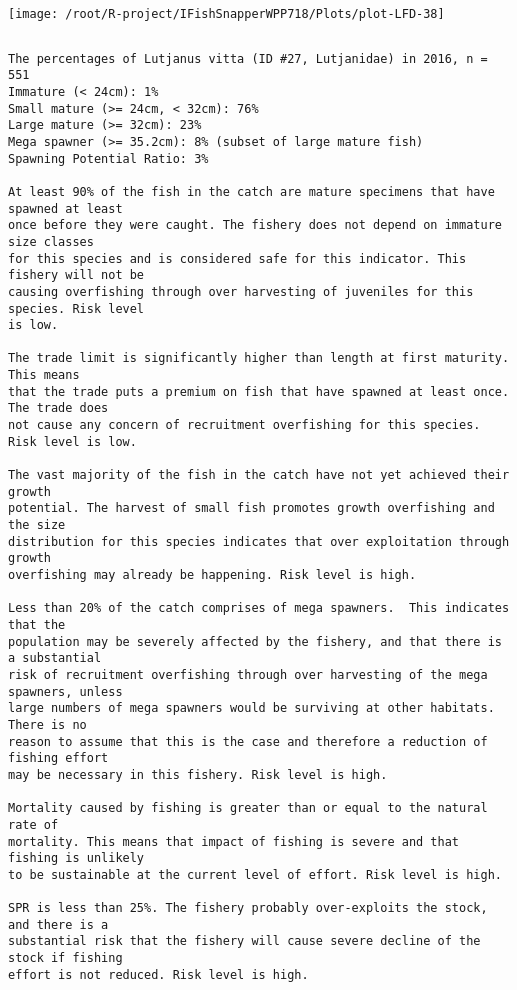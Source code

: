 \documentclass{report}\usepackage[]{graphicx}\usepackage[]{color}
\makeatletter
\def\maxwidth{ %
  \ifdim\Gin@nat@width>\linewidth
    \linewidth
  \else
    \Gin@nat@width
  \fi
}
\newenvironment{kframe}{%
 \def\at@end@of@kframe{}%
 \ifinner\ifhmode%
  \def\at@end@of@kframe{\end{minipage}}%
  \begin{minipage}{\columnwidth}%
 \fi\fi%
 \def\FrameCommand##1{\hskip\@totalleftmargin \hskip-\fboxsep
 \colorbox{shadecolor}{##1}\hskip-\fboxsep
     \hskip-\linewidth \hskip-\@totalleftmargin \hskip\columnwidth}%
 \MakeFramed {\advance\hsize-\width
   \@totalleftmargin\z@ \linewidth\hsize
   \@setminipage}}%
 {\par\unskip\endMakeFramed%
 \at@end@of@kframe}
\newenvironment{knitrout}{}{} %
\makeatother
\begin{document}
\begin{knitrout}
\texttt{[image: /root/R-project/IFishSnapperWPP718/Plots/plot-LFD-38]} 
\begin{kframe}\begin{verbatim}
\end{verbatim}
\end{kframe}
\clearpage
\newpage
\begin{kframe}\begin{verbatim}The percentages of Lutjanus vitta (ID #27, Lutjanidae) in 2016, n = 551
Immature (< 24cm): 1%
Small mature (>= 24cm, < 32cm): 76%
Large mature (>= 32cm): 23%
Mega spawner (>= 35.2cm): 8% (subset of large mature fish)
Spawning Potential Ratio: 3%
 
At least 90% of the fish in the catch are mature specimens that have spawned at least
once before they were caught. The fishery does not depend on immature size classes
for this species and is considered safe for this indicator. This fishery will not be
causing overfishing through over harvesting of juveniles for this species. Risk level
is low.

The trade limit is significantly higher than length at first maturity.  This means
that the trade puts a premium on fish that have spawned at least once. The trade does
not cause any concern of recruitment overfishing for this species. Risk level is low.

The vast majority of the fish in the catch have not yet achieved their growth
potential. The harvest of small fish promotes growth overfishing and the size
distribution for this species indicates that over exploitation through growth
overfishing may already be happening. Risk level is high.

Less than 20% of the catch comprises of mega spawners.  This indicates that the
population may be severely affected by the fishery, and that there is a substantial
risk of recruitment overfishing through over harvesting of the mega spawners, unless
large numbers of mega spawners would be surviving at other habitats. There is no
reason to assume that this is the case and therefore a reduction of fishing effort
may be necessary in this fishery. Risk level is high.
 
Mortality caused by fishing is greater than or equal to the natural rate of
mortality. This means that impact of fishing is severe and that fishing is unlikely
to be sustainable at the current level of effort. Risk level is high.
 
SPR is less than 25%. The fishery probably over-exploits the stock, and there is a
substantial risk that the fishery will cause severe decline of the stock if fishing
effort is not reduced. Risk level is high.
 

\end{verbatim}
\end{kframe}
\end{knitrout}
\end{document}
